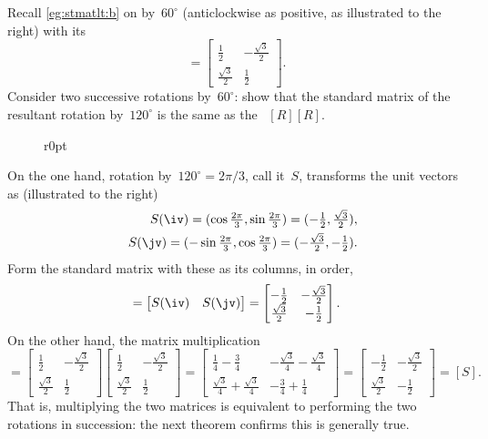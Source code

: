 \begin{example} 
Recall \cref{eg:stmatlt:b} on  by~\(60^\circ\) (anticlockwise as positive, as illustrated to the right) with its 
\begin{equation*}
[R]=\begin{bmatrix} \frac12&-\frac{\sqrt3}2
\\\frac{\sqrt3}2&\frac12 \end{bmatrix}.
\end{equation*}
Consider two successive rotations by~\(60^\circ\): show that the standard matrix of the resultant rotation by~\(120^\circ\)  is the same as the ~\([R][R]\).

\begin{solution} 
\begin{figure}r{0pt}
\end{figure}
On the one hand, rotation by~\(120^\circ=2\pi/3\), call it~\(S\), transforms the unit vectors as (illustrated to the right)
\begin{eqnarray*}
&&S(\iv)=(\cos\tfrac{2\pi}3,\sin\tfrac{2\pi}3)
=(-\tfrac12,\tfrac{\sqrt3}2),
\\&&S(\jv)=(-\sin\tfrac{2\pi}3,\cos\tfrac{2\pi}3)
=(-\tfrac{\sqrt3}2,-\tfrac12).
\end{eqnarray*}
Form the standard matrix with these as its columns, in order,
\begin{equation*}
[S]=\begin{bmatrix} S(\iv)&S(\jv) \end{bmatrix}
=\begin{bmatrix} -\frac12&-\frac{\sqrt3}2
\\\frac{\sqrt3}2&-\frac12 \end{bmatrix}.
\end{equation*}
On the other hand, the matrix multiplication
\begin{equation*}
[R][R]
=\begin{bmatrix} \frac12&-\frac{\sqrt3}2
\\\frac{\sqrt3}2&\frac12 \end{bmatrix}\begin{bmatrix} \frac12&-\frac{\sqrt3}2
\\\frac{\sqrt3}2&\frac12 \end{bmatrix}
=\begin{bmatrix} \tfrac14-\tfrac34 & -\tfrac{\sqrt3}4-\tfrac{\sqrt3}4
\\ \tfrac{\sqrt3}4+\tfrac{\sqrt3}4 & -\tfrac34+\tfrac14\end{bmatrix}
=\begin{bmatrix} -\frac12&-\frac{\sqrt3}2
\\\frac{\sqrt3}2&-\frac12 \end{bmatrix}=[S].
\end{equation*}
That is, multiplying the two matrices is equivalent to performing the two rotations in succession: the next theorem confirms this is generally true.
\aqed

\end{solution}
\end{example}




